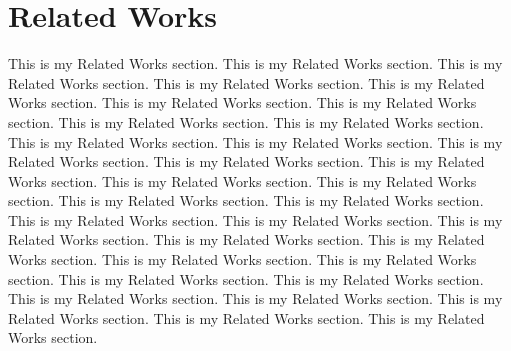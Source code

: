 
\section{Related Works}

This is my Related Works section. This is my Related Works section. This is my Related Works section. This is my Related Works section. This is my Related Works section. This is my Related Works section. This is my Related Works section. This is my Related Works section. This is my Related Works section. This is my Related Works section. This is my Related Works section. This is my Related Works section. This is my Related Works section. This is my Related Works section. This is my Related Works section. This is my Related Works section. This is my Related Works section. This is my Related Works section. This is my Related Works section. This is my Related Works section. This is my Related Works section. This is my Related Works section. This is my Related Works section. This is my Related Works section. This is my Related Works section. This is my Related Works section. This is my Related Works section. This is my Related Works section. This is my Related Works section. This is my Related Works section. This is my Related Works section. This is my Related Works section. 


